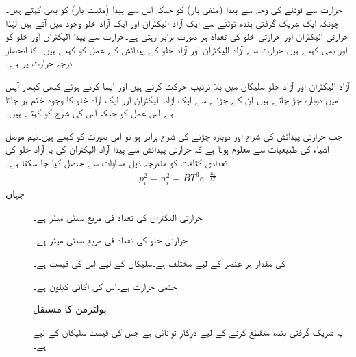 حرارت سے  ٹوٹنے کی وجہ سے پیدا  (منفی بار) کو
   جبکہ اس سے پیدا  (مثبت بار) کو 
  بھی کہتے ہیں۔چونکہ ایک شریک گرفتی بندھ ٹوٹنے سے ایک آزاد الیکٹران اور ایک آزاد خلو وجود میں آتے ہیں لہٰذا حرارتی الیکٹران اور حرارتی خلو کی تعداد ہر صورت برابر رہتی ہے۔حرارت سے پیدا الیکٹران اور خلو کو   اور   بھی کہتے ہیں۔حرارت سے آزاد الیکٹران اور آزاد خلو کے پیدائش کے عمل کو   کہتے ہیں۔  کا انحصار درجہ حرارت پر ہے۔

آزاد الیکٹران اور آزاد خلو سلیکان میں بلا ترتیب حرکت کرتے ہیں اور ایسا کرتے ہوئے کبھی کبھار آپس میں دوبارہ جڑ جاتے ہیں۔ان کے جڑنے سے ایک آزاد الیکٹران اور ایک آزاد خلو کا وجود ختم ہو جاتا ہے۔اس عمل کو   جبکہ اس کی شرح کو  کہتے ہیں۔

جب حرارتی پیدائش کی شرح اور دوبارہ چڑنے کی شرح برابر ہو تو اس صورت کو  کہتے ہیں۔نیم موصل اشیاء کی طبیعیات سے معلوم ہوتا ہے کہ حرارتی پیدائش سے پیدا آزاد الیکٹران کی    یا آزاد خلو کی تعدادی کثافت   کو مندرجہ ذیل مساوات سے حاصل کیا جا سکتا ہے۔
\begin{align} \label{مساوات_ڈایوڈ_حرارتی_توازن_میں_تعدادی_کثافت}
p_i^{2}=n_i^{2}=B T^{3} e^{-\frac{E_{\sigma}}{k T}}
\end{align}
جہاں
\begin{description}
\item
[ ] حرارتی الیکٹران کی تعداد فی مربع سنٹی میٹر ہے۔
\item
[  ] حرارتی خلو کی تعداد فی مربع سنٹی میٹر ہے۔
\item
[ ] کی مقدار ہر عنصر کے لیے مختلف ہے۔سلیکان کے لیے اس کی قیمت  ہے۔
\item
[] حتمی حرارت ہے۔اس کی اکائی کیلون  ہے۔
\item
[ ]  بولٹزمن کا مستقل 
\item
[]  یہ شریک گرفتی بندھ منقطع کرنے کے لیے درکار توانائی ہے جس کی قیمت سلیکان کے لیے  ہے۔
\end{description}



